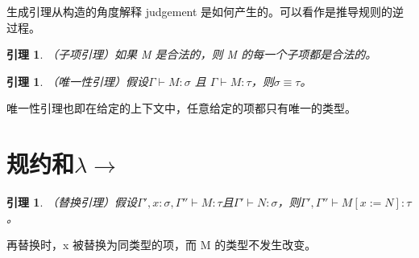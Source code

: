 \documentclass[UTF8]{article}
\newtheorem{lemma}[thm]{引理}
\begin{document}
		生成引理从构造的角度解释 judgement 是如何产生的。可以看作是推导规则的逆过程。
		
		\begin{lemma} （子项引理）如果 M 是合法的，则 M 的每一个子项都是合法的。
		\end{lemma}
	
		\begin{lemma} （唯一性引理）假设$\Gamma\vdash M:\sigma$ 且 $\Gamma\vdash M:\tau$，则$\sigma\equiv\tau$。
		\end{lemma}
		
		唯一性引理也即在给定的上下文中，任意给定的项都只有唯一的类型。
		
	\section{规约和$\lambda{\rightarrow}$}
		\begin{lemma} （替换引理）假设$\Gamma',x:\sigma,\Gamma''\vdash M:\tau$且$\Gamma'\vdash N:\sigma$，则$\Gamma',\Gamma''\vdash M\left[x:=N\right]:\tau$。
		\end{lemma}
	
		再替换时，x 被替换为同类型的项，而 M 的类型不发生改变。
\end{document}
